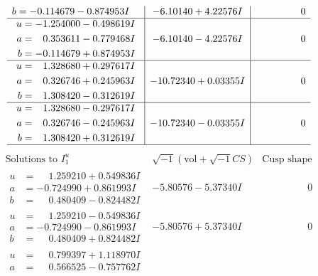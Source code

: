 \documentclass[1p]{elsarticle_modified}
\theoremstyle{definition}
\newcommand{\I}{\sqrt{-1}}
\begin{document}
$$\begin{array}{c|c|c}
\begin{aligned}
b &= -0.114679 - 0.874953 I\end{aligned}
 & -6.10140 + 4.22576 I & \phantom{-0.000000 } 0 \\ \hline\begin{aligned}
u &= -1.254000 - 0.498619 I \\
a &= \phantom{-}0.353611 - 0.779468 I \\
b &= -0.114679 + 0.874953 I\end{aligned}
 & -6.10140 - 4.22576 I & \phantom{-0.000000 } 0 \\ \hline\begin{aligned}
u &= \phantom{-}1.328680 + 0.297617 I \\
a &= \phantom{-}0.326746 + 0.245963 I \\
b &= \phantom{-}1.308420 - 0.312619 I\end{aligned}
 & -10.72340 + 0.03355 I & \phantom{-0.000000 } 0 \\ \hline\begin{aligned}
u &= \phantom{-}1.328680 - 0.297617 I \\
a &= \phantom{-}0.326746 - 0.245963 I \\
b &= \phantom{-}1.308420 + 0.312619 I\end{aligned}
 & -10.72340 - 0.03355 I & \phantom{-0.000000 } 0\\
 \hline 
 \end{array}$$\newpage$$\begin{array}{c|c|c}  
\text{Solutions to }I^u_{1}& \I (\text{vol} + \sqrt{-1}CS) & \text{Cusp shape}\\
 \hline 
\begin{aligned}
u &= \phantom{-}1.259210 + 0.549836 I \\
a &= -0.724990 + 0.861993 I \\
b &= \phantom{-}0.480409 - 0.824482 I\end{aligned}
 & -5.80576 - 5.37340 I & \phantom{-0.000000 } 0 \\ \hline\begin{aligned}
u &= \phantom{-}1.259210 - 0.549836 I \\
a &= -0.724990 - 0.861993 I \\
b &= \phantom{-}0.480409 + 0.824482 I\end{aligned}
 & -5.80576 + 5.37340 I & \phantom{-0.000000 } 0 \\ \hline\begin{aligned}
u &= \phantom{-}0.799397 + 1.118970 I \\
a &= \phantom{-}0.566525 - 0.757762 I \\

\end{aligned}
\end{array}$$
\end{document}
